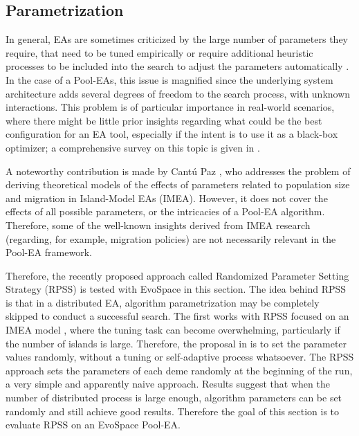 \subsection{Parametrization}
In general, EAs are sometimes criticized by the large number of parameters they require,
that need to be tuned empirically or require additional heuristic processes to be included into the search to
adjust the parameters automatically \cite{parameters,ss}.
In the case of a Pool-EAs, this issue is magnified since the underlying system architecture adds several degrees of freedom to the search process,
with unknown interactions.
This problem is of particular importance in real-world scenarios, where there might be little prior insights regarding what could be the best
configuration for an EA tool, especially if the intent is to use it as a black-box optimizer;
a comprehensive survey on this topic is given in \cite{parameters}. 

A noteworthy contribution is made by Cant\'u Paz \cite{cantu}, who addresses the problem of deriving theoretical models of the effects
of parameters related to population size and migration in Island-Model EAs (IMEA).
However, it does not cover the effects of all possible parameters, or the intricacies of a Pool-EA algorithm.
Therefore, some of the well-known insights derived from IMEA research (regarding, for example, migration policies)
are not necessarily relevant in the Pool-EA framework.

Therefore, the recently proposed approach called Randomized Parameter Setting Strategy (RPSS) \cite{fuku1,fuku2}
is tested with EvoSpace in this section.
The idea behind RPSS is that in a distributed EA, algorithm parametrization may be completely skipped to conduct a successful search.
The first works with RPSS focused on an IMEA model \cite{fuku1,fuku2},
where the tuning task can become overwhelming, particularly if the number of islands is large.
Therefore, the proposal in \cite{fuku1} is to set the parameter values randomly, without a tuning or self-adaptive process whatsoever.
The RPSS approach sets the parameters of each deme randomly at the beginning of the run, a very simple and apparently naive approach.
Results suggest that when the number of distributed process is large enough, algorithm parameters can be set randomly and still achieve
good results.
Therefore the goal of this section is to evaluate RPSS on an EvoSpace Pool-EA.

